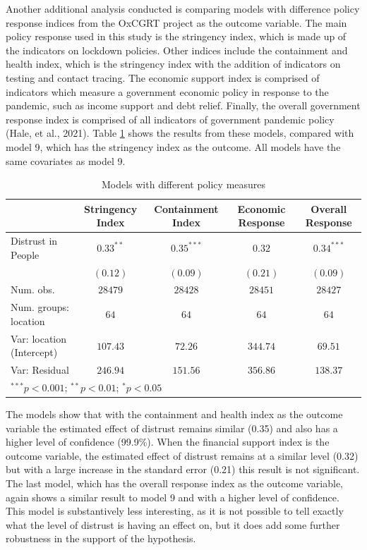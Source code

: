 \documentclass[
  12pt,
]{article}
\begin{document}
Another additional analysis conducted is comparing models with difference policy response indices from the OxCGRT project as the outcome variable. The main policy response used in this study is the stringency index, which is made up of the indicators on lockdown policies. Other indices include the containment and health index, which is the stringency index with the addition of indicators on testing and contact tracing. The economic support index is comprised of indicators which measure a government economic policy in response to the pandemic, such as income support and debt relief. Finally, the overall government response index is comprised of all indicators of government pandemic policy (Hale, et al., 2021). Table \ref{tab:policy} shows the results from these models, compared with model 9, which has the stringency index as the outcome. All models have the same covariates as model 9.\\

\begin{table}
\caption{Models with different policy measures}
\begin{center}
\begin{small}
\begin{tabular}{l c c c c}
\hline
 & Stringency
Index & Containment
Index & Economic
Response & Overall
Response \\
\hline
Distrust in People        & $0.33^{**}$ & $0.35^{***}$ & $0.32$   & $0.34^{***}$ \\
                          & $(0.12)$    & $(0.09)$     & $(0.21)$ & $(0.09)$     \\
\hline
Num. obs.                 & $28479$     & $28428$      & $28451$  & $28427$      \\
Num. groups: location     & $64$        & $64$         & $64$     & $64$         \\
Var: location (Intercept) & $107.43$    & $72.26$      & $344.74$ & $69.51$      \\
Var: Residual             & $246.94$    & $151.56$     & $356.86$ & $138.37$     \\
\hline
\multicolumn{5}{l}{\tiny{$^{***}p<0.001$; $^{**}p<0.01$; $^{*}p<0.05$}}
\end{tabular}
\end{small}
\label{tab:policy}
\end{center}
\end{table}

\hfill\break
The models show that with the containment and health index as the outcome variable the estimated effect of distrust remains similar (0.35) and also has a higher level of confidence (99.9\%). When the financial support index is the outcome variable, the estimated effect of distrust remains at a similar level (0.32) but with a large increase in the standard error (0.21) this result is not significant. The last model, which has the overall response index as the outcome variable, again shows a similar result to model 9 and with a higher level of confidence. This model is substantively less interesting, as it is not possible to tell exactly what the level of distrust is having an effect on, but it does add some further robustness in the support of the hypothesis.\\
\end{document}
